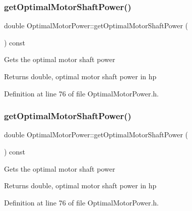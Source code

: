 \subsubsection{\texorpdfstring{get\+Optimal\+Motor\+Shaft\+Power()}{getOptimalMotorShaftPower()}\hspace{0.1cm}{\footnotesize\ttfamily [2/3]}}
{\footnotesize\ttfamily double Optimal\+Motor\+Power\+::get\+Optimal\+Motor\+Shaft\+Power (\begin{DoxyParamCaption}{ }\end{DoxyParamCaption}) const\hspace{0.3cm}{\ttfamily [inline]}}

Gets the optimal motor shaft power \begin{DoxyReturn}{Returns}
double, optimal motor shaft power in hp 
\end{DoxyReturn}


Definition at line 76 of file Optimal\+Motor\+Power.\+h.

\mbox{\label{class_optimal_motor_power_a7d6e976abf406c54637d3b51e098d7c8}} 
\subsubsection{\texorpdfstring{get\+Optimal\+Motor\+Shaft\+Power()}{getOptimalMotorShaftPower()}\hspace{0.1cm}{\footnotesize\ttfamily [3/3]}}
{\footnotesize\ttfamily double Optimal\+Motor\+Power\+::get\+Optimal\+Motor\+Shaft\+Power (\begin{DoxyParamCaption}{ }\end{DoxyParamCaption}) const\hspace{0.3cm}{\ttfamily [inline]}}

Gets the optimal motor shaft power \begin{DoxyReturn}{Returns}
double, optimal motor shaft power in hp 
\end{DoxyReturn}


Definition at line 76 of file Optimal\+Motor\+Power.\+h.

\mbox{\label{class_optimal_motor_power_ada8a9e3caac34c54470ad13ffe7edf53}} 
